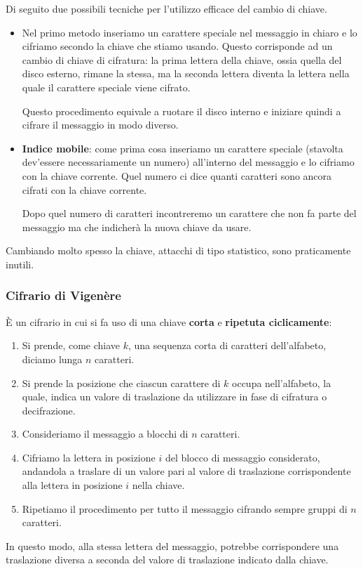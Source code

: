 Di seguito due possibili tecniche per l'utilizzo efficace del cambio di chiave.
\begin{itemize}
	\item Nel primo metodo inseriamo un carattere speciale nel messaggio in chiaro e lo cifriamo secondo la chiave che
	      stiamo usando. Questo corrisponde ad un cambio di chiave di cifratura: la prima lettera della chiave, ossia
	      quella del disco esterno, rimane la stessa, ma la seconda lettera diventa la lettera nella quale il carattere
	      speciale viene cifrato.

	      Questo procedimento equivale a ruotare il disco interno e iniziare quindi a cifrare il messaggio in modo
	      diverso.
	\item \textbf{Indice mobile}: come prima cosa inseriamo un carattere speciale (stavolta dev'essere necessariamente
	      un numero) all'interno del messaggio e lo cifriamo con la chiave corrente. Quel numero ci dice quanti
	      caratteri sono ancora cifrati con la chiave corrente.

	      Dopo quel numero di caratteri incontreremo un carattere che non fa parte del messaggio ma che indicher\`a la
	      nuova chiave da usare.
\end{itemize}
Cambiando molto spesso la chiave, attacchi di tipo statistico, sono praticamente inutili.

\subsubsection{Cifrario di Vigen\`ere}
\`E un cifrario in cui si fa uso di una chiave \textbf{corta} e \textbf{ripetuta ciclicamente}:
\begin{enumerate}
	\item Si prende, come chiave $k$, una sequenza corta di caratteri dell'alfabeto, diciamo lunga $n$ caratteri.
	\item Si prende la posizione che ciascun carattere di $k$ occupa nell'alfabeto, la quale, indica un valore di
	      traslazione da utilizzare in fase di cifratura o decifrazione.
	\item Consideriamo il messaggio a blocchi di $n$ caratteri.
	\item Cifriamo la lettera in posizione $i$ del blocco di messaggio considerato, andandola a traslare di un valore
	      pari al valore di traslazione corrispondente alla lettera in posizione $i$ nella chiave.
	\item Ripetiamo il procedimento per tutto il messaggio cifrando sempre gruppi di $n$ caratteri.
\end{enumerate}
In questo modo, alla stessa lettera del messaggio, potrebbe corrispondere una traslazione diversa a seconda del valore di
traslazione indicato dalla chiave.

